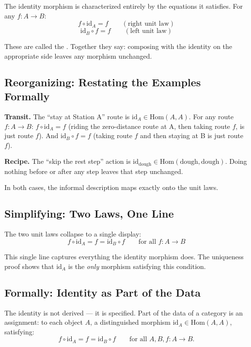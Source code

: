 The identity morphism is characterized entirely by the equations it satisfies.
For any $f : A \to B$:
\[
  f \circ \mathrm{id}_A = f \qquad (\text{right unit law})
\]
\[
  \mathrm{id}_B \circ f = f \qquad (\text{left unit law})
\]

These are called the . Together they say: composing with the
identity on the appropriate side leaves any morphism unchanged.

\subsection{Reorganizing: Restating the Examples Formally}

\textbf{Transit.} The ``stay at Station A'' route is $\mathrm{id}_A \in
\mathrm{Hom}(A, A)$. For any route $f : A \to B$: $f \circ \mathrm{id}_A = f$
(riding the zero-distance route at A, then taking route $f$, is just route
$f$). And $\mathrm{id}_B \circ f = f$ (taking route $f$ and then staying at B
is just route $f$).

\textbf{Recipe.} The ``skip the rest step'' action is $\mathrm{id}_\text{dough}
\in \mathrm{Hom}(\text{dough}, \text{dough})$. Doing nothing before or after
any step leaves that step unchanged.

In both cases, the informal description maps exactly onto the unit laws.

\subsection{Simplifying: Two Laws, One Line}

The two unit laws collapse to a single display:
\[
  f \circ \mathrm{id}_A = f = \mathrm{id}_B \circ f \qquad \text{for all } f : A \to B
\]

This single line captures everything the identity morphism does. The uniqueness
proof shows that $\mathrm{id}_A$ is the \emph{only} morphism satisfying this
condition.

\subsection{Formally: Identity as Part of the Data}

The identity is not derived --- it is specified. Part of the data of a category
is an assignment: to each object $A$, a distinguished morphism
$\mathrm{id}_A \in \mathrm{Hom}(A, A)$, satisfying:
\[
  f \circ \mathrm{id}_A = f = \mathrm{id}_B \circ f \qquad
  \text{for all } A, B, f : A \to B.
\]

